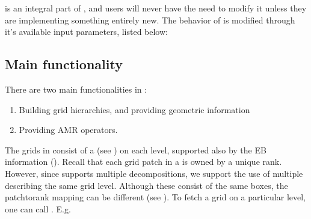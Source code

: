 \documentclass[letterpaper,10pt,english]{sphinxmanual}
\begin{document}
\sphinxAtStartPar
{\hyperref[\detokenize{Source/AmrMesh:chap-amrmesh}]{}} is an integral part of , and users will never have the need to modify it unless they are implementing something entirely new. The behavior of {\hyperref[\detokenize{Source/AmrMesh:chap-amrmesh}]{}} is modified through it’s available input parameters, listed below:


\subsection{Main functionality}
\label{\detokenize{Source/AmrMesh:main-functionality}}
\sphinxAtStartPar
There are two main functionalities in :
\begin{enumerate}
%
\item {} 
\sphinxAtStartPar
Building grid hierarchies, and providing geometric information

\item {} 
\sphinxAtStartPar
Providing AMR operators.

\end{enumerate}

\sphinxAtStartPar
The grids in  consist of a  (see {\hyperref[\detokenize{Source/ChomboBasics:chap-basics}]{}}) on each level, supported also by the EB information ().
Recall that each grid patch in a  is owned by a unique rank.
However, since  supports multiple decompositions, we support the use of multiple  describing the same grid level.
Although these  consist of the same boxes, the patch\sphinxhyphen{}to\sphinxhyphen{}rank mapping can be different (see {\hyperref[\detokenize{Source/Realm:chap-realm}]{}}).
To fetch a grid on a particular level, one can call .
E.g.

\begin{sphinxVerbatim}[commandchars=\\\{\},formatcom=\scriptsize]
  
  

    \PYG{p}{[}\PYG{p}{]}
\end{sphinxVerbatim}
\end{document}
